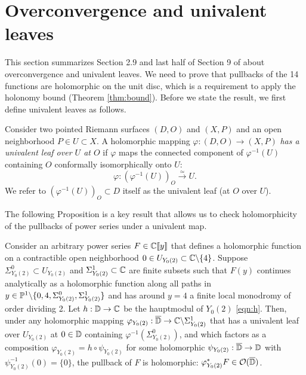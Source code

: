 \section{Overconvergence and univalent leaves}

This section summarizes Section 2.9 and last half of Section 9 of \cite{calegari2024linear} about overconvergence and univalent leaves.
We need to prove that pullbacks of the 14 functions are holomorphic on the unit disc, which is a requirement to apply the holonomy bound (Theorem \ref{thm:bound}).
Before we state the result, we first define univalent leaves as follows.



\begin{definition}
Consider two pointed Riemann surfaces $(D, O)$ and $(X, P)$ and an open neighborhood $P \in U \subset X$.
A holomorphic mapping $\varphi: (D, O) \to (X, P)$ \emph{has a univalent leaf over $U$ at $O$} if $\varphi$ maps the connected component of $\varphi^{-1}(U)$ containing $O$ conformally isomorphically onto $U$:
$$
    \varphi: (\varphi^{-1}(U))_O \xrightarrow{\simeq} U.
$$
We refer to $(\varphi^{-1}(U))_O \subset D$ itself as the univalent leaf (at $O$ over $U$).
\end{definition}

The following Proposition is a key result that allows us to check holomorphicity of the pullbacks of power series under a univalent map.


\begin{proposition}
\label{prop:pullbackhol}
Consider an arbitrary power series $F \in \mathbb{C} \llbracket y \rrbracket$ that defines a holomorphic function on a contractible open neighborhood $0 \in U_{Y_0(2)} \subset \mathbb{C} \backslash \{4\}$.
Suppose $\Sigma_{Y_0(2)}^{0} \subset U_{Y_0(2)}$ and $\Sigma_{Y_0(2)}^{1} \subset \mathbb{C}$ are finite subsets such that $F(y)$ continues analytically as a holomorphic function along all paths in $y \in \mathbb{P}^1 \backslash \{0, 4, \Sigma_{Y_0(2)}^0, \Sigma_{Y_0(2)}^1\}$ and has around $y = 4$ a finite local monodromy of order dividing 2.
Let $h: \mathbb{D} \to \mathbb{C}$ be the hauptmodul of $Y_0(2)$ \eqref{eqn:h}.
Then, under any holomorphic mapping $\varphi_{Y_0(2)} : \overline{\mathbb{D}} \to \mathbb{C} \backslash \Sigma_{Y_0(2)}^1$ that has a univalent leaf over $U_{Y_0(2)}$ at $0 \in \mathbb{D}$ containing $\varphi^{-1}(\Sigma_{Y_0(2)}^{0})$, and which factors as a composition $\varphi_{Y_0(2)} = h \circ \psi_{Y_0(2)}$ for some holomorphic $\psi_{Y_0(2)} : \overline{\mathbb{D}} \to \mathbb{D}$ with $\psi_{Y_0(2)}^{-1}(0) = \{0\}$, the pullback of $F$ is holomorphic: $\varphi_{Y_0(2)}^\ast F \in \mathcal{O}(\overline{\mathbb{D}})$.
\end{proposition}


